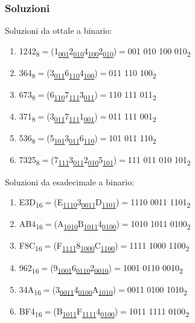 \documentclass{article}
\begin{document}
\subsubsection*{Soluzioni}
Soluzioni da ottale a binario:
\begin{enumerate}

    \item 1242\textsubscript{8}$=$(1\textsubscript{\underline{001}}2\textsubscript{\underline{010}}4\textsubscript{\underline{100}}2\textsubscript{\underline{010}})$=$001 010 100 010\textsubscript{2}
    \item 364\textsubscript{8}$=$(3\textsubscript{\underline{011}}6\textsubscript{\underline{110}}4\textsubscript{\underline{100}})$=$011 110 100\textsubscript{2}
    \item 673\textsubscript{8}$=$(6\textsubscript{\underline{110}}7\textsubscript{\underline{111}}3\textsubscript{\underline{011}})$=$110 111 011\textsubscript{2}
    \item 371\textsubscript{8}$=$(3\textsubscript{\underline{011}}7\textsubscript{\underline{111}}1\textsubscript{\underline{001}})$=$011 111 001\textsubscript{2}
    \item 536\textsubscript{8}$=$(5\textsubscript{\underline{101}}3\textsubscript{\underline{011}}6\textsubscript{\underline{110}})$=$101 011 110\textsubscript{2}
    \item 7325\textsubscript{8}$=$(7\textsubscript{\underline{111}}3\textsubscript{\underline{011}}2\textsubscript{\underline{010}}5\textsubscript{\underline{101}})$=$111 011 010 101\textsubscript{2}
\end{enumerate}
Soluzioni da esadecimale a binario:
\begin{enumerate}
    \item E3D\textsubscript{16}$=$(E\textsubscript{\underline{1110}}3\textsubscript{\underline{0011}}D\textsubscript{\underline{1101}})$=$1110 0011 1101\textsubscript{2}
    \item AB4\textsubscript{16}$=$(A\textsubscript{\underline{1010}}B\textsubscript{\underline{1011}}4\textsubscript{\underline{0100}})$=$1010 1011 0100\textsubscript{2}
    \item F8C\textsubscript{16}$=$(F\textsubscript{\underline{1111}}8\textsubscript{\underline{1000}}C\textsubscript{\underline{1100}})$=$1111 1000 1100\textsubscript{2}
    \item 962\textsubscript{16}$=$(9\textsubscript{\underline{1001}}6\textsubscript{\underline{0110}}2\textsubscript{\underline{0010}})$=$1001 0110 0010\textsubscript{2}
    \item 34A\textsubscript{16}$=$(3\textsubscript{\underline{0011}}4\textsubscript{\underline{0100}}A\textsubscript{\underline{1010}})$=$0011 0100 1010\textsubscript{2}
    \item BF4\textsubscript{16}$=$(B\textsubscript{\underline{1011}}F\textsubscript{\underline{1111}}4\textsubscript{\underline{0100}})$=$1011 1111 0100\textsubscript{2}
\end{enumerate}
\end{document}
